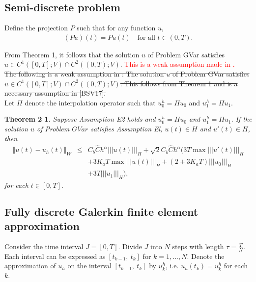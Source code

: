 \documentclass[../../main.tex]{subfiles}
\begin{document}
\subsection{Semi-discrete problem}




Define the projection $P$ such that for any function $u$, 
\begin{eqnarray*}
	(Pu)(t) = Pu(t) \ \ \ \textrm{ for all } t \in (0,T).
\end{eqnarray*}



From Theorem 1, it follows that the solution $u$ of Problem GVar satisfies $u \in C^1([0,T]; V) \cap C^2((0,T);V)$. \textcolor{red}{This is a weak assumption made in \cite{BV13}.}\\

\sout{The following is a weak assumption in \cite{BV13}: The solution $u$ of Problem GVar satisfies $u \in C^1([0,T]; V) \cap C^2((0,T);V)$. This follows from Theorem 1 and is a necessary assumption in [BSV17].}\\

Let $\Pi$ denote the interpolation operator such that $u_0^h = \Pi u_0$ and $u_1^h = \Pi u_1$. 

\newtheorem*{DC_Thm4}{Theorem 2}
\begin{DC_Thm4}
	Suppose Assumption E2 holds and $u_{0}^{h}=\Pi u_{0}$ and $u_{1}^{h}=\Pi u_{1}.$ If the solution $u$ of Problem $GVar$ satisfies Assumption El, $u(t)\in H$ and $u'(t)\in H$, then
	\begin{eqnarray*}
		\Vert u(t)-u_{h}(t)\Vert_{W} & \leq & C_{b} \hat{C}h^{\alpha}|||u(t)|||_{H}+\sqrt{2}C_{b}\hat{C}h^{\alpha}(3T\max|||u'(t)|||_{H}\\
		& & +3K_{a}T\max|||u(t)|||_{H}+(2+3K_{a}T)|||u_{0}|||_{H} \\
		& & +3T|||u_{1}|||_{H}) ,
	\end{eqnarray*} for each $t\in[0, T].$
\end{DC_Thm4}


\subsection{Fully discrete Galerkin finite element approximation}
Consider the time interval $J = [0,T]$. Divide $J$ into $N$ steps with length $\tau = \frac{T}{N}$. Each interval can be expressed as $[t_{k-1}, \ t_k]$ for $k = 1,...,N$. Denote the approximation of $u_h$ on the interval $[t_{k-1}, \ t_k]$ by $u_k^h$, i.e. $u_h(t_k) = u_k^h$ for each $k$.\\
\end{document}
